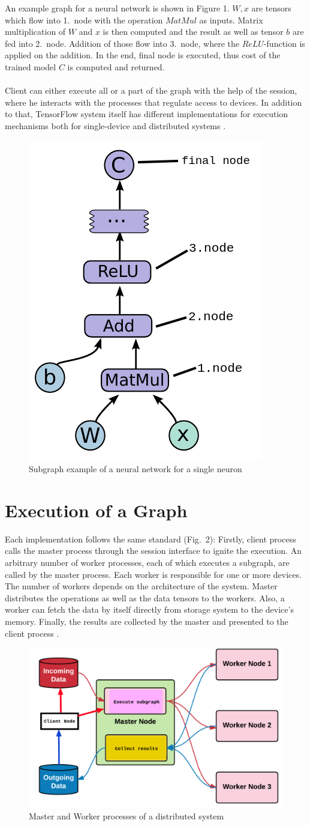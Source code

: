 \documentclass[ieeetran]{article}
\begin{document}
An example graph for a neural network is shown in Figure 1. $W, x$ are tensors which flow into 1.\ node with the operation $MatMul$ as inputs. Matrix multiplication of $W$ and $x$ is then computed and the result as well as tensor $b$ are fed into 2.\ node. Addition of those flow into 3.\ node, where the $ReLU$-function is applied on the addition. In the end, final node is executed, thus cost of the trained model $C$ is computed and returned.
\\ \\Client can either execute all or a part of the graph with the help of the session, where he interacts with the processes that regulate access to devices. In addition to that, TensorFlow system itself has different implementations for execution mechanisms both for single-device and distributed systems \cite{first}.
\begin{figure}[h!]
  \centering
   \includegraphics[width=0.25\linewidth]{graph}
\caption[placeholder]{Subgraph example of a neural network for a single neuron}
  \label{fig:graph_caption_placeholder_subgraph_example_for_a_neural_networkfootnotemark}
\end{figure}
\section{Execution of a Graph} %
\label{sec:execution_of_a_graph}
Each implementation follows the same standard (Fig.\ 2): Firstly, client process calls the master process through the session interface to ignite the execution. An arbitrary number of worker processes, each of which executes a subgraph, are called by the master process. Each worker is responsible for one or more devices. The number of workers depends on the architecture of the system. Master distributes the operations as well as the data tensors to the workers. Also, a worker can fetch the data by itself directly from storage system to the device's memory. Finally, the results are collected by the master and presented to the client process \cite{first}.
\begin{figure}[h!]
  \centering
\includegraphics[width=0.5\linewidth]{executionofgraph}
 \caption[placeholder]{Master and Worker processes of a distributed system} 
  \label{fig:executionofgraph}
\end{figure}
\end{document}
